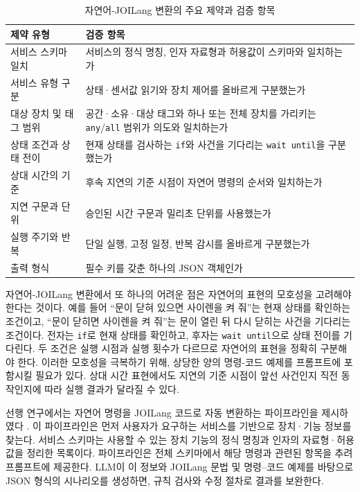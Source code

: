\documentclass[10pt,twocolumn]{article}
\begin{document}
\begin{table}[t]
\color{revisionblue}
\centering
\caption{\textcolor{revisionblue}{자연어-JOILang 변환의 주요 제약과 검증 항목}}
\label{tab:taxonomy}
\footnotesize
\renewcommand{\arraystretch}{1.12}
\begin{tabularx}{\columnwidth}{@{}p{}X@{}}
\toprule
\textbf{제약 유형} & \textbf{검증 항목} \\
\midrule
서비스 스키마 일치 & 서비스의 정식 명칭, 인자 자료형과 허용값이 스키마와 일치하는가 \\
서비스 유형 구분 & 상태·센서값 읽기와 장치 제어를 올바르게 구분했는가 \\
대상 장치 및 태그 범위 & 공간·소유·대상 태그와 하나 또는 전체 장치를 가리키는 \texttt{any}/\texttt{all} 범위가 의도와 일치하는가 \\
상태 조건과 상태 전이 & 현재 상태를 검사하는 \texttt{if}와 사건을 기다리는 \texttt{wait until}을 구분했는가 \\
상대 시간의 기준 & 후속 지연의 기준 시점이 자연어 명령의 순서와 일치하는가 \\
지연 구문과 단위 & 승인된 시간 구문과 밀리초 단위를 사용했는가 \\
실행 주기와 반복 & 단일 실행, 고정 일정, 반복 감시를 올바르게 구분했는가 \\
출력 형식 & 필수 키를 갖춘 하나의 JSON 객체인가 \\
\bottomrule
\end{tabularx}
\end{table}

자연어-JOILang 변환에서 또 하나의 어려운 점은 자연어의 표현의 모호성을 고려해야 한다는 것이다. 예를 들어 ``문이 닫혀 있으면 사이렌을 켜 줘''는 현재 상태를 확인하는 조건이고, ``문이 닫히면 사이렌을 켜 줘''는 문이 열린 뒤 다시 닫히는 사건을 기다리는 조건이다. 전자는 \texttt{if}로 현재 상태를 확인하고, 후자는 \texttt{wait until}으로 상태 전이를 기다린다. 두 조건은 실행 시점과 실행 횟수가 다르므로 자연어의 표현을 정확히 구분해야 한다. 이러한 모호성을 극복하기 위해, 상당한 양의 명령-코드 예제를 프롬프트에 포함시킬 필요가 있다. 상대 시간 표현에서도 지연의 기준 시점이 앞선 사건인지 직전 동작인지에 따라 실행 결과가 달라질 수 있다.

선행 연구에서는 자연어 명령을 JOILang 코드로 자동 변환하는 파이프라인을 제시하였다
\cite{REF_JOILANG_PIPELINE}. 이 파이프라인은 먼저 사용자가 요구하는 서비스를 기반으로  장치·기능 정보를 찾는다. 서비스 스키마는 사용할 수 있는 장치 기능의 정식 명칭과 인자의 자료형·허용값을 정리한 목록이다. 파이프라인은 전체 스키마에서 해당 명령과 관련된 항목을 추려 프롬프트에 제공한다. LLM이 이 정보와 JOILang 문법 및 명령--코드 예제를 바탕으로 JSON 형식의 시나리오를 생성하면, 규칙 검사와 수정 절차로 결과를 보완한다.
\end{document}

